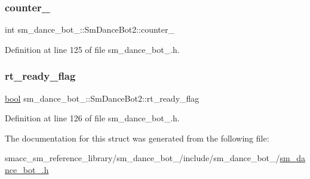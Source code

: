 \subsubsection{\texorpdfstring{counter\+\_}{counter\_1}}
{\footnotesize\ttfamily int sm\+\_\+dance\+\_\+bot\+\_\+::\+Sm\+Dance\+Bot2\+::counter\+\_}



Definition at line 125 of file sm\+\_\+dance\+\_\+bot\+\_.\+h.

\mbox{\label{structsm__dance__bot__2_1_1SmDanceBot2_a864092503acb358517e58bb8db064cbe}} 
\subsubsection{\texorpdfstring{rt\+\_\+ready\+\_\+flag}{rt\_ready\_flag}}
{\footnotesize\ttfamily \hyperlink{classbool}{bool} sm\+\_\+dance\+\_\+bot\+\_\+::\+Sm\+Dance\+Bot2\+::rt\+\_\+ready\+\_\+flag}



Definition at line 126 of file sm\+\_\+dance\+\_\+bot\+\_.\+h.



The documentation for this struct was generated from the following file\+:\begin{DoxyCompactItemize}
\item 
smacc\+\_\+sm\+\_\+reference\+\_\+library/sm\+\_\+dance\+\_\+bot\+\_/include/sm\+\_\+dance\+\_\+bot\+\_/\hyperlink{sm__dance__bot__2_8h}{sm\+\_\+dance\+\_\+bot\+\_.\+h}\end{DoxyCompactItemize}
